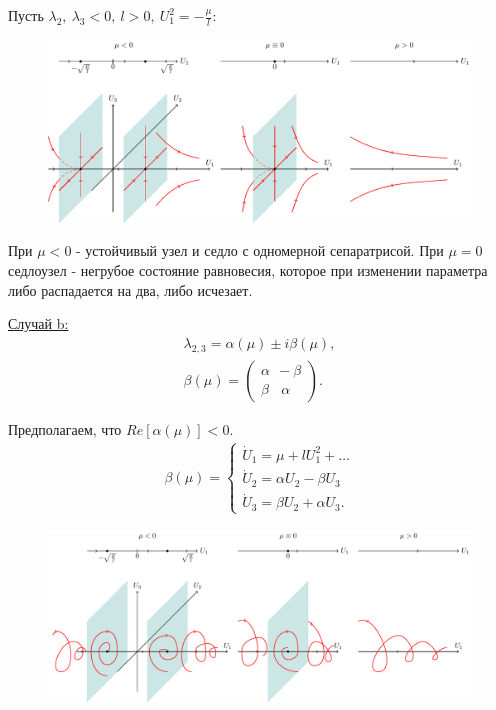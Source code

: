 Пусть $\lambda_2,~\lambda_3<0,~l>0,~U_1^2=-\frac{\mu}{l}$:
\begin{figure}[H]
	\centering
	\includegraphics[width=1\linewidth]{fig/fig49.pdf}   
\end{figure}

При $\mu<0$ - устойчивый узел и седло с одномерной сепаратрисой. При $\mu=0$ седлоузел - негрубое состояние равновесия, которое при изменении параметра либо распадается на два, либо исчезает. 

\underline{Случай b:}
\begin{gather*}
	\lambda_{2,3}=\alpha(\mu)\pm i \beta(\mu), \\
	\beta(\mu)=
	\begin{pmatrix}
		\alpha~~-\beta \\
		\beta~~~~\alpha
	\end{pmatrix}
	.
\end{gather*}

Предполагаем, что $Re[\alpha(\mu)]<0$.
\begin{gather*}
	\beta(\mu)=
	\begin{cases}
		\dot U_1 = \mu+lU_1^2+\dots \\
		\dot U_2 = \alpha U_2-\beta U_3 \\
		\dot U_3 = \beta U_2+\alpha U_3.
	\end{cases}
\end{gather*}
\begin{figure}[H]
	\centering
	\includegraphics[width=1\linewidth]{fig/fig50.pdf}   
\end{figure}

